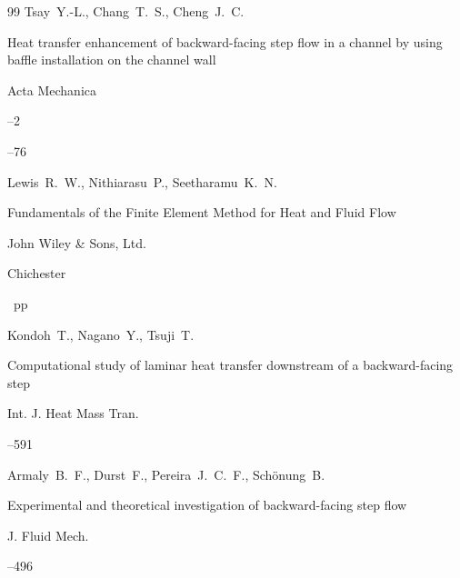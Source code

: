 \begin{thebibliography}{99}
\by Tsay~Y.-L., Chang~T.~S., Cheng~J.~C.

\paper Heat transfer enhancement of backward-facing step flow in a channel by using baffle installation on the channel wall

\jour Acta Mechanica



--2

--76





\by Lewis~R.~W., Nithiarasu~P., Seetharamu~K.~N.

\book Fundamentals of the Finite Element Method for Heat and Fluid Flow

\publ John Wiley \& Sons, Ltd.


\publaddr Chichester

~pp \nofrills





\by Kondoh~T., Nagano~Y., Tsuji~T.

\paper Computational study of laminar heat transfer downstream of a backward-facing step

\jour Int. J. Heat Mass Tran.




–591





\by Armaly~B.~F., Durst~F., Pereira~J.~C.~F., Sch\"onung~B.

\paper Experimental and theoretical investigation of backward-facing step flow

\jour J. Fluid Mech.



--496






\end{thebibliography}
